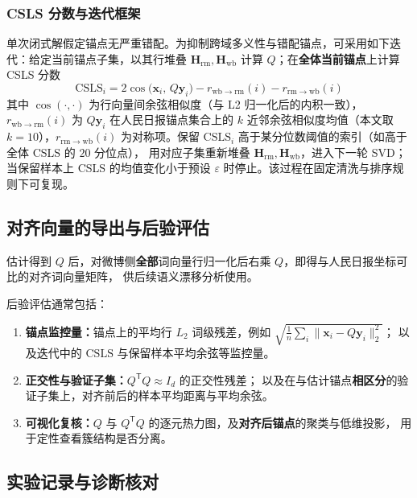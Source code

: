\documentclass[withoutpreface]{cumcmthesis}
\begin{document}
\subsubsection{CSLS 分数与迭代框架}
单次闭式解假定锚点无严重错配。为抑制跨域多义性与错配锚点，可采用如下迭代：给定当前锚点子集，以其行堆叠 $\mathbf{H}_{\mathrm{rm}},\mathbf{H}_{\mathrm{wb}}$ 计算 $Q$；在\textbf{全体当前锚点}上计算 CSLS 分数
\begin{equation}
  \mathrm{CSLS}_i
  = 2\cos\!\bigl(\mathbf{x}_i,\,Q\mathbf{y}_i\bigr)
    - r_{\mathrm{wb}\to\mathrm{rm}}(i) - r_{\mathrm{rm}\to\mathrm{wb}}(i) 
\end{equation}
其中 $\cos(\cdot,\cdot)$ 为行向量间余弦相似度（与 L2 归一化后的内积一致），$r_{\mathrm{wb}\to\mathrm{rm}}(i)$ 为
 $Q\mathbf{y}_i$ 在人民日报锚点集合上的 $k$ 近邻余弦相似度均值（本文取 $k=10$），$r_{\mathrm{rm}\to\mathrm{wb}}(i)$ 
 为对称项。保留 $\mathrm{CSLS}_i$ 高于某分位数阈值的索引（如高于全体 $\mathrm{CSLS}$ 的 $20$ 分位点），
 用对应子集重新堆叠 $\mathbf{H}_{\mathrm{rm}},\mathbf{H}_{\mathrm{wb}}$，进入下一轮 SVD；
 当保留样本上 CSLS 的均值变化小于预设 $\varepsilon$ 时停止。该过程在固定清洗与排序规则下可复现。

\subsection{对齐向量的导出与后验评估}

估计得到 $Q$ 后，对微博侧\textbf{全部}词向量行归一化后右乘 $Q$，即得与人民日报坐标可比的对齐词向量矩阵，
供后续语义漂移分析使用。

后验评估通常包括：
\begin{enumerate}[leftmargin=2em,itemsep=0.35em,parsep=0pt,topsep=0.35em]
  \item \textbf{锚点监控量：}锚点上的平均行 $L_2$ 词级残差，例如
    $\sqrt{\frac{1}{n}\sum_i \lVert \mathbf{x}_i - Q\mathbf{y}_i\rVert_2^2}$；
    以及迭代中的 $\mathrm{CSLS}$ 与保留样本平均余弦等监控量。
  \item \textbf{正交性与验证子集：}$Q^{\mathsf{T}}Q\approx I_d$ 的正交性残差；
    以及在与估计锚点\textbf{相区分}的验证子集上，对齐前后的样本平均距离与平均余弦。
  \item \textbf{可视化复核：}$Q$ 与 $Q^{\mathsf{T}}Q$ 的逐元热力图，及\textbf{对齐后锚点}的聚类与低维投影，
    用于定性查看簇结构是否分离。
\end{enumerate}

\subsection{实验记录与诊断核对}
\end{document}

